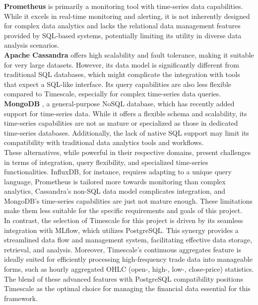 \textbf{Prometheus} \cite{PrometheusDocs} is primarily a monitoring tool with time-series data capabilities. While it excels in real-time monitoring and alerting, it is not inherently designed for complex data analytics and lacks the relational data management features provided by SQL-based systems, potentially limiting its utility in diverse data analysis scenarios. \\

\textbf{Apache Cassandra} \cite{ApacheCassandraDocs} offers high scalability and fault tolerance, making it suitable for very large datasets. However, its data model is significantly different from traditional SQL databases, which might complicate the integration with tools that expect a SQL-like interface. Its query capabilities are also less flexible compared to Timescale, especially for complex time-series data queries. \\

\textbf{MongoDB} \cite{MongoDBDocs}, a general-purpose NoSQL database, which has recently added support for time-series data. While it offers a flexible schema and scalability, its time-series capabilities are not as mature or specialized as those in dedicated time-series databases. Additionally, the lack of native SQL support may limit its compatibility with traditional data analytics tools and workflows. \\

These alternatives, while powerful in their respective domains, present challenges in terms of integration, query flexibility, and specialized time-series functionalities. InfluxDB, for instance, requires adapting to a unique query language, Prometheus is tailored more towards monitoring than complex analytics, Cassandra's non-SQL data model complicates integration, and MongoDB's time-series capabilities are just not mature enough. These limitations make them less suitable for the specific requirements and goals of this project. \\

In contrast, the selection of Timescale for this project is driven by its seamless integration with MLflow, which utilizes PostgreSQL. This synergy provides a streamlined data flow and management system, facilitating effective data storage, retrieval, and analysis. Moreover, Timescale's continuous aggregates feature is ideally suited for efficiently processing high-frequency trade data into manageable forms, such as hourly aggregated OHLC (open-, high-, low-, close-price) statistics. The blend of these advanced features with PostgreSQL compatibility positions Timescale as the optimal choice for managing the financial data essential for this framework.

